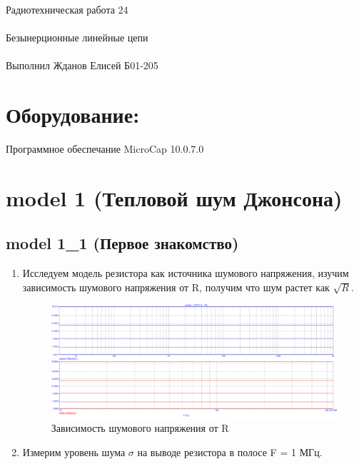 \documentclass{astroedu-lab}
\begin{document}
\pagestyle{plain}

\begin{problem}{\huge Радиотехническая работа 24\\\\Безынерционные линейные цепи\\\\Выполнил Жданов Елисей Б01-205}

\section{Оборудование:}

Программное обеспечание MicroCap 10.0.7.0

\section{\textbf{model 1 (Тепловой шум Джонсона)}}

\subsection*{\textbf{model 1\_1 (Первое знакомство)}}

\begin{enumerate}

\item

Исследуем модель резистора как источника шумового напряжения, изучим зависимость шумового напряжения от R, получим что шум растет как $\sqrt{R}$.

\begin{figure}[h!]
    \centering
    \includegraphics[scale=0.3]{images/mod1_1_1_2.png}
    \caption{Зависимость шумового напряжения от R}
    \label{fig:eR}
\end{figure}

\item

Измерим уровень шума $\sigma$ на выводе резистора в полосе F = 1 МГц.


\end{enumerate}
\end{problem}
\end{document}
